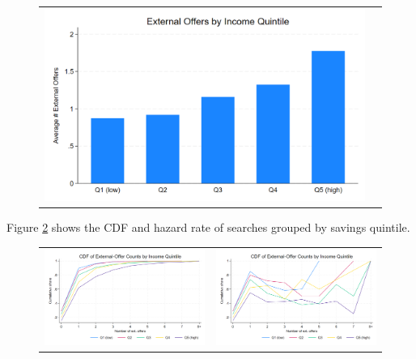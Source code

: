 \documentclass[12pt]{article}
\begin{document}
\begin{figure}[H]
\caption{}
\label{fig:ie2_3}
\centering{}%
\begin{tabular}{cc}
\includegraphics[scale=0.27]{figures/IE2_search_by_income_quintile.png}
\end{tabular}
\end{figure}

Figure \ref{fig:ie2_4} shows the CDF and hazard rate of searches grouped by savings quintile. 

\begin{figure}[H] 
\caption{}
\label{fig:ie2_4}
\centering{}%
\begin{tabular}{cc}
\includegraphics[scale=0.26]{figures/IE2_search_CDF_by_income_quintile.png} & \includegraphics[scale=0.26]{figures/IE2_search_hazardrate_by_income_quintile.png}
\end{tabular}
\end{figure}
\end{document}
